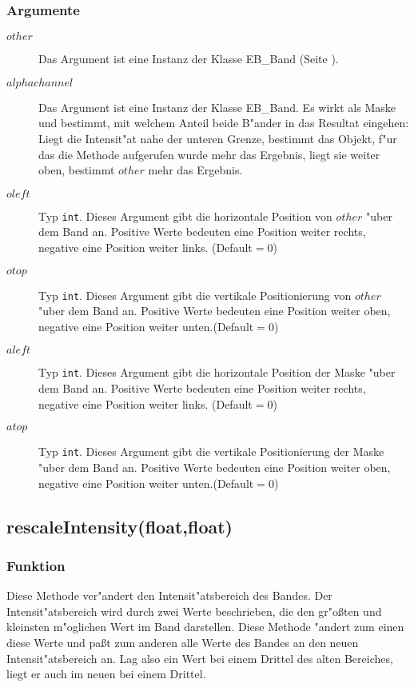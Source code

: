 \documentclass[12pt,a4paper,draft,twoside,onecolumn,titlepage]{book}
\newcommand{\pref}[1]{(Seite \pageref{#1})}
\newcommand{\carg}[1]{$ #1 $}
\newcommand{\ctyp}[1]{{\tt #1}}
\newcommand{\class}[1]{{\sc #1}}
\newcommand{\arglist}[1]{\footnotesize{#1}}
\begin{document}
\subsubsection{Argumente}
\begin{description}
\item[\carg{other}]{Das Argument ist eine Instanz der Klasse \class{EB\_Band} \pref{classebband}.}
\item[\carg{alphachannel}]{Das Argument ist eine Instanz der Klasse \class{EB\_Band}. Es wirkt als Maske und bestimmt, mit welchem Anteil beide B"ander in das Resultat eingehen: Liegt die Intensit"at nahe der unteren Grenze, bestimmt das Objekt, f"ur das die Methode aufgerufen wurde mehr das Ergebnis, liegt sie weiter oben, bestimmt \carg{other} mehr das Ergebnis.}
\item[\carg{oleft}]{Typ \ctyp{int}. Dieses Argument gibt die horizontale Position von \carg{other} "uber dem Band an. Positive Werte bedeuten eine Position weiter rechts, negative eine Position weiter links. (Default$=0$)}
\item[\carg{otop}]{Typ \ctyp{int}. Dieses Argument gibt die vertikale Positionierung von \carg{other} "uber dem Band an. Positive Werte bedeuten eine Position weiter oben, negative eine Position weiter unten.(Default$=0$)}
\item[\carg{aleft}]{Typ \ctyp{int}. Dieses Argument gibt die horizontale Position der Maske "uber dem Band an. Positive Werte bedeuten eine Position weiter rechts, negative eine Position weiter links. (Default$=0$)}
\item[\carg{atop}]{Typ \ctyp{int}. Dieses Argument gibt die vertikale Positionierung der Maske "uber dem Band an. Positive Werte bedeuten eine Position weiter oben, negative eine Position weiter unten.(Default$=0$)}
\end{description}
\subsection{rescaleIntensity\arglist{(float,float)}}
\subsubsection{Funktion}
Diese Methode ver"andert den Intensit"atsbereich des Bandes. Der Intensit"atsbereich wird durch zwei Werte beschrieben, die den gr"o{\ss}ten und kleinsten m"oglichen Wert im Band darstellen. Diese Methode "andert zum einen diese Werte und pa{\ss}t zum anderen alle Werte des Bandes an den neuen Intensit"atsbereich an. Lag also ein Wert bei einem Drittel des alten Bereiches, liegt er auch im neuen bei einem Drittel.
\end{document}
